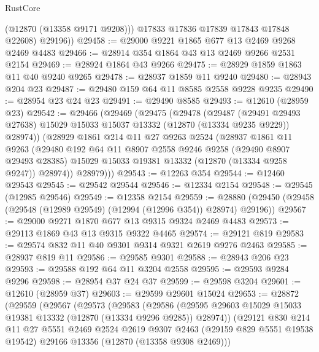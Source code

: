 \begin{lexlean}{RustCore}
\begin{coremodule}
            (@12870 (@13358 @9171 @9208)))
          @17833
          @17836
          @17839
          @17843
          @17848
          @22608)
        @29196))
@29458 := @29000 @9221 @1865 @677 @13 @2469 @9268 @2469 @4483
@29466 := @28914 @354 @1864 @43 @13 @2469 @9266 @2531 @2154
@29469 := @28924 @1864 @43 @9266
@29475 := @28929 @1859 @1863 @11 @40 @9240 @9265
@29478 := @28937 @1859 @11 @9240
@29480 := @28943 @204 @23
@29487 := @29480 @159 @64 @11 @8585 @2558 @9228 @9235
@29490 := @28954 @23 @24 @23
@29491 := @29490 @8585
@29493 := @12610 (@28959 @23)
@29542 := @29466
    (@29469
      (@29475
        (@29478
          (@29487
            (@29491 @29493 @27638)
            @15029
            @15033
            @15037
            @13332
            (@12870 (@13334 @9235 @9229))
            @28974))
        (@28929
          @1861
          @214
          @11
          @27
          @9263
          @2524
          (@28937
            @1861
            @11
            @9263
            (@29480
              @192
              @64
              @11
              @8907
              @2558
              @9246
              @9258
              (@29490 @8907 @29493 @28385)
              @15029
              @15033
              @19381
              @13332
              (@12870 (@13334 @9258 @9247))
              @28974))
          @28979)))
@29543 := @12263 @354
@29544 := @12460 @29543
@29545 := @29542 @29544
@29546 := @12334 @2154
@29548 := @29545 (@12985 @29546)
@29549 := @12358 @2154
@29559 := @28880 (@29450 (@29458 (@29548 (@12989 @29549) (@12994 (@12996 @354)) @28974) @29196))
@29567 := @29000 @9271 @1870 @677 @13 @9315 @9324 @2469 @4483
@29573 := @29113 @1869 @43 @13 @9315 @9322 @4465
@29574 := @29121 @819
@29583 := @29574 @832 @11 @40 @9301 @9314 @9321 @2619 @9276 @2463
@29585 := @28937 @819 @11
@29586 := @29585 @9301
@29588 := @28943 @206 @23
@29593 := @29588 @192 @64 @11 @3204 @2558
@29595 := @29593 @9284 @9296
@29598 := @28954 @37 @24 @37
@29599 := @29598 @3204
@29601 := @12610 (@28959 @37)
@29603 := @29599 @29601 @15024
@29653 := @28872
    (@29559
      (@29567
        (@29573
          (@29583
            (@29586
              (@29595 @29603 @15029 @15033 @19381 @13332 (@12870 (@13334 @9296 @9285)) @28974))
            (@29121
              @830
              @214
              @11
              @27
              @5551
              @2469
              @2524
              @2619
              @9307
              @2463
              (@29159 @829 @5551 @19538 @19542)
              @29166
              @13356
              (@12870 (@13358 @9308 @2469)))

\end{coremodule}
\end{lexlean}
